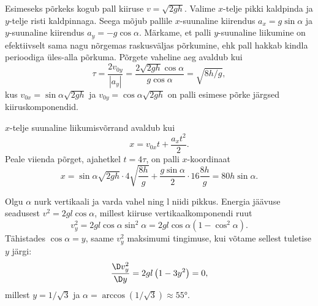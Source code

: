 \documentclass[10pt, twoside]{article}
\begin{document}
{
\solu
Esimeseks põrkeks kogub pall kiiruse $v = \sqrt{2gh}$. Valime $x$-telje pikki kaldpinda ja $y$-telje risti kaldpinnaga. Seega mõjub pallile $x$-suunaline kiirendus $a_x = g\sin\alpha$ ja $y$-suunaline kiirendus $a_y = -g\cos\alpha$. Märkame, et palli $y$-suunaline liikumine on efektiivselt sama nagu nõrgemas raskusväljas põrkumine, ehk pall hakkab kindla perioodiga üles-alla põrkuma. Põrgete vaheline aeg avaldub kui 
\[
\tau = \frac{2v_{0y}}{|a_y|} = \frac{2 \sqrt{2 g h} \cos \alpha}{g \cos \alpha} = \sqrt{8h/g},
\]
kus $v_{0x} = \sin\alpha\sqrt{2gh}$ ja $v_{0y}=\cos\alpha\sqrt{2gh}$ on palli esimese põrke järgsed kiiruskomponendid.

$x$-telje suunaline liikumisvõrrand avaldub kui
\[
x = v_{0x}t + \frac{a_xt^2}{2}.
\]
Peale viienda põrget, ajahetkel $t = 4\tau$, on palli $x$-koordinaat
\[
x = \sin\alpha\sqrt{2gh}\cdot 4\sqrt{\frac{8h}{g}} + \frac{g\sin\alpha}{2}\cdot 16\frac{8h}{g} = 80h\sin\alpha.
\]
\probend
\bigskip


\solu
Olgu $\alpha$ nurk vertikaali ja varda vahel ning l niidi pikkus. Energia jäävuse seadusest
$v^2 = 2gl \cos \alpha$, millest kiiruse vertikaalkomponendi ruut
\[
v_{y}^{2}=2 g l \cos \alpha \sin ^{2} \alpha=2 g l \cos \alpha\left(1-\cos ^{2} \alpha\right).
\]
Tähistades $\cos \alpha = y$, saame $v_y^2$ maksimumi tingimuse, kui võtame sellest tuletise $y$ järgi:
\[
\frac{\D v_{y}^{2}}{\D y}=2 g l\left( 1-3 y^{2}\right)=0,
\]
millest $y = 1/ \sqrt 3$ ja $\alpha = \arccos \left( 1/ \sqrt 3\right) \approx \ang{55}$.

\vspace{0.5\baselineskip}

}
\end{document}
